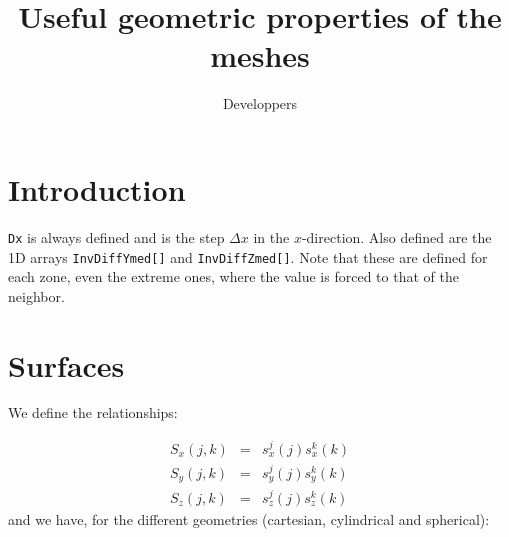 \documentclass{article}
\title{Useful geometric properties of the meshes}
\author{Developpers}
\begin{document}
\maketitle
\section{Introduction} {\tt Dx} is always defined and is the step $\Delta x$ in the $x$-direction.  Also defined are the 1D arrays {\tt InvDiffYmed[]} and {\tt InvDiffZmed[]}.  Note that these are defined for each zone, even the extreme ones, where the value is forced to that of the neighbor.

\section{Surfaces}

We define the relationships:

\begin{eqnarray}
  \label{eq:1}
  S_x(j,k) &=& s_x^j(j)s_x^k(k)\\
  S_y(j,k) &=& s_y^j(j)s_y^k(k)\\
  S_z(j,k) &=& s_z^j(j)s_z^k(k)
\end{eqnarray}
and we have, for the different geometries (cartesian, cylindrical and spherical):
\end{document}
